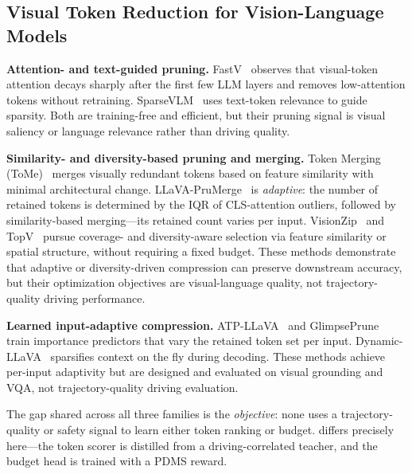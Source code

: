 \documentclass[letterpaper]{article} %
\begin{document}
\subsection{Visual Token Reduction for Vision-Language Models}

\textbf{Attention- and text-guided pruning.}
FastV~\citep{chen2024fastv} observes that visual-token attention decays sharply
after the first few LLM layers and removes low-attention tokens without
retraining.
SparseVLM~\citep{xu2024sparsevlm} uses text-token relevance to guide sparsity.
Both are training-free and efficient, but their pruning signal is visual
saliency or language relevance rather than driving quality.

\textbf{Similarity- and diversity-based pruning and merging.}
Token Merging (ToMe)~\citep{bolya2023tome} merges visually redundant tokens
based on feature similarity with minimal architectural change.
LLaVA-PruMerge~\citep{shang2024llavaprumerge} is \emph{adaptive}: the number
of retained tokens is determined by the IQR of CLS-attention outliers, followed
by similarity-based merging---its retained count varies per input.
VisionZip~\citep{visionzip2025} and TopV~\citep{topv2025} pursue coverage- and
diversity-aware selection via feature similarity or spatial structure, without
requiring a fixed budget.
These methods demonstrate that adaptive or diversity-driven compression can
preserve downstream accuracy, but their optimization objectives are
visual-language quality, not trajectory-quality driving performance.

\textbf{Learned input-adaptive compression.}
ATP-LLaVA~\citep{atpllava2025} and GlimpsePrune~\citep{glimpseprune2025} train
importance predictors that vary the retained token set per input.
Dynamic-LLaVA~\citep{dynamicllava2025} sparsifies context on the fly during
decoding.
These methods achieve per-input adaptivity but are designed and evaluated on
visual grounding and VQA, not trajectory-quality driving evaluation.

The gap shared across all three families is the \emph{objective}: none uses a
trajectory-quality or safety signal to learn either token ranking or budget.
\ours{} differs precisely here---the token scorer is distilled from a
driving-correlated teacher, and the budget head is trained with a PDMS reward.
\end{document}

